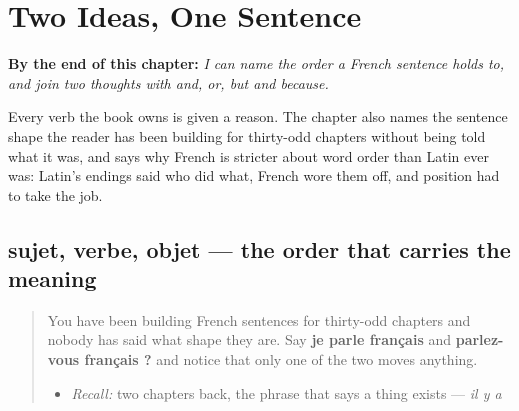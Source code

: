
\chapter{Two Ideas, One Sentence}
\label{ch:fr-joiners}

\begin{chapteropening}
\textbf{By the end of this chapter:} \emph{I can name the order a French sentence holds to, and join two thoughts with and, or, but and because.}

Every verb the book owns is given a reason. The chapter also names the sentence shape the reader has been building for thirty-odd chapters without being told what it was, and says why French is stricter about word order than Latin ever was: Latin's endings said who did what, French wore them off, and position had to take the job.
\end{chapteropening}

\section[sujet, verbe, objet]{sujet, verbe, objet — the order that carries the meaning}

\label{lesson:FR-C36-svo}



\begin{quote}
You have been building French sentences for thirty-odd chapters and nobody has said what shape they are. Say \textbf{je parle français} and \textbf{parlez-vous français ?} and notice that only one of the two moves anything.

\begin{itemize}
\raggedright
  \item \emph{Recall:} two chapters back, the phrase that says a thing exists — \emph{il y a}
\end{itemize}
\end{quote}

